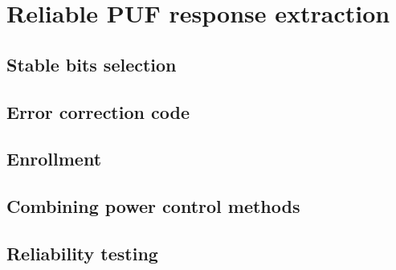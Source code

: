 \chapter{Reliable PUF response extraction}\label{sec:response_extraction} %

\section{Stable bits selection}


\section{Error correction code}\label{sec:ecc}

\section{Enrollment}

\section{Combining power control methods}

\section{Reliability testing}

